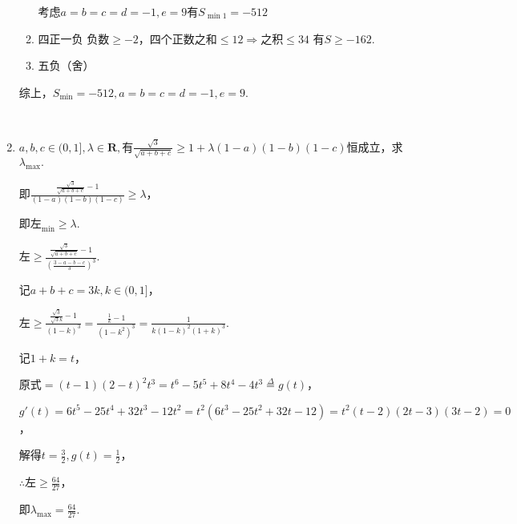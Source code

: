 \documentclass[8pt]{article}
\begin{document}
\begin{enumerate}
\begin{enumerate}[label=(\arabic*)]
					考虑$a=b=c=d=-1, e=9$有$S_{\min1}=-512$

				\item 四正一负
					负数$\geq -2$，四个正数之和$\leq 12 \Rightarrow$之积$\leq 34$ 有$S\geq -162.$

				\item 五负（舍）

			\end{enumerate}

			综上，$S_{\min}=-512, a=b=c=d=-1, e=9.$

		~\\

		\item $a, b, c\in(0,1], \lambda \in \mathbf{R},$有$\displaystyle \frac{\sqrt{3}}{\sqrt{a+b+c}}\geq1+\lambda(1-a)(1-b)(1-c)$恒成立，求$\lambda_{\max}.$

			即$\displaystyle\frac{\frac{\sqrt{3}}{\sqrt{a+b+c}}-1}{(1-a)(1-b)(1-c)}\geq\lambda$，

			即$\text{左}_{\min}\geq\lambda.$

			$\displaystyle\text{左}\geq\frac{\frac{\sqrt{3}}{\sqrt{a+b+c}}-1}{\left(\frac{3-a-b-c}{3}\right)^3}.$

			记$a+b+c=3k, k\in(0,1]$，

			$\displaystyle\text{左}\geq\frac{\frac{\sqrt{3}}{\sqrt{3}k}-1}{(1-k)^3}=\frac{\frac{1}{k}-1}{(1-k^2)^3}=\frac{1}{k(1-k)^2(1+k)^3}.$

			记$1+k=t$，

			$\displaystyle\text{原式}=(t-1)(2-t)^2t^3=t^6-5t^5+8t^4-4t^3\overset{\Delta}{=}g(t)$，

			$g'(t)=6t^5-25t^4+32t^3-12t^2=t^2(6t^3-25t^2+32t-12)=t^2(t-2)(2t-3)(3t-2)=0$，

			解得$\displaystyle t=\frac{3}{2}, g(t)=\frac{1}{2}$，

			$\displaystyle \therefore \text{左}\geq \frac{64}{27}$，

			即$\displaystyle \lambda_{\max}=\frac{64}{27}.$

	\end{enumerate}
\end{document}
